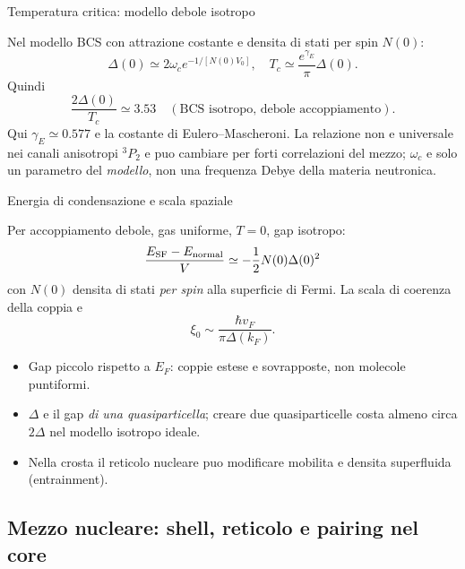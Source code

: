 \begin{frame}[t]{Temperatura critica: modello debole isotropo}
\vspace*{3mm}
\small

Nel modello BCS con attrazione costante e densita di stati per spin $N(0)$:
\[
\Delta(0)\simeq2\omega_c e^{-1/[N(0)V_0]},\quad
T_c\simeq\frac{e^{\gamma_E}}\pi\Delta(0).
\]
Quindi
\[
\boxed{\frac{2\Delta(0)}{T_c}\simeq3.53\quad
(\text{BCS isotropo, debole accoppiamento}).}
\]
Qui $\gamma_E\simeq0.577$ e la costante di Eulero--Mascheroni.
La relazione non e universale nei canali anisotropi ${}^3P_2$ e puo cambiare per forti correlazioni del mezzo; $\omega_c$ e solo un parametro del \emph{modello}, non una frequenza Debye della materia neutronica.
\end{frame}

\begin{frame}[t]{Energia di condensazione e scala spaziale}
\vspace*{3mm}
\small

Per accoppiamento debole, gas uniforme, $T=0$, gap isotropo:
\[
\frac{E_{\rm SF}-E_{\rm normal}}{V}
\simeq-\frac12 N(0)\Delta(0)^2
\]
con $N(0)$ densita di stati \emph{per spin} alla superficie di Fermi.
La scala di coerenza della coppia e
\[
\boxed{\xi_0\sim\frac{\hbar v_F}{\pi\Delta(k_F)}.}
\]
\begin{itemize}
\item Gap piccolo rispetto a $E_F$: coppie estese e sovrapposte, non molecole puntiformi.
\item $\Delta$ e il gap \emph{di una quasiparticella}; creare due quasiparticelle costa almeno circa $2\Delta$ nel modello isotropo ideale.
\item Nella crosta il reticolo nucleare puo modificare mobilita e densita superfluida (entrainment).
\end{itemize}
\end{frame}


\subsection{Mezzo nucleare: shell, reticolo e pairing nel core}

